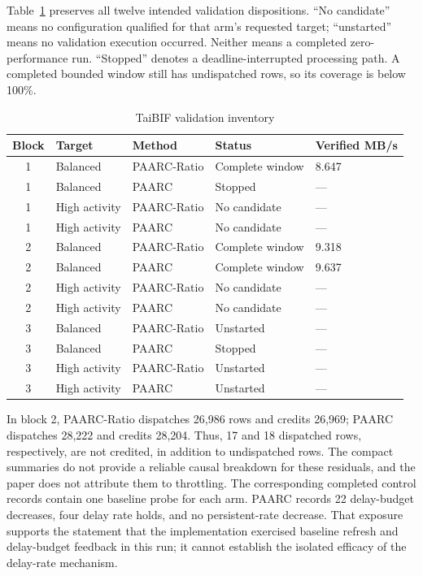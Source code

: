 \documentclass[10pt]{article}
\newcommand{\paarc}{PAARC}
\newcommand{\ratio}{PAARC-Ratio}
\begin{document}
Table~\ref{tab:tai-status} preserves all twelve intended validation dispositions. ``No candidate'' means no configuration qualified for that arm's requested target; ``unstarted'' means no validation execution occurred. Neither means a completed zero-performance run. ``Stopped'' denotes a deadline-interrupted processing path. A completed bounded window still has undispatched rows, so its coverage is below 100\%.
\begin{table}[h]\centering\small
\caption{TaiBIF validation inventory}\label{tab:tai-status}
\begin{tabular}{cllll}\toprule
Block & Target & Method & Status & Verified MB/s\\\midrule
1 & Balanced & PAARC-Ratio & Complete window & 8.647\\
1 & Balanced & PAARC & Stopped & ---\\
1 & High activity & PAARC-Ratio & No candidate & ---\\
1 & High activity & PAARC & No candidate & ---\\
2 & Balanced & PAARC-Ratio & Complete window & 9.318\\
2 & Balanced & PAARC & Complete window & 9.637\\
2 & High activity & PAARC-Ratio & No candidate & ---\\
2 & High activity & PAARC & No candidate & ---\\
3 & Balanced & PAARC-Ratio & Unstarted & ---\\
3 & Balanced & PAARC & Stopped & ---\\
3 & High activity & PAARC-Ratio & Unstarted & ---\\
3 & High activity & PAARC & Unstarted & ---\\\bottomrule
\end{tabular}\end{table}
In block 2, \ratio{} dispatches 26,986 rows and credits 26,969; \paarc{} dispatches 28,222 and credits 28,204. Thus, 17 and 18 dispatched rows, respectively, are not credited, in addition to undispatched rows. The compact summaries do not provide a reliable causal breakdown for these residuals, and the paper does not attribute them to throttling. The corresponding completed control records contain one baseline probe for each arm. \paarc{} records 22 delay-budget decreases, four delay rate holds, and no persistent-rate decrease. That exposure supports the statement that the implementation exercised baseline refresh and delay-budget feedback in this run; it cannot establish the isolated efficacy of the delay-rate mechanism.
\end{document}

